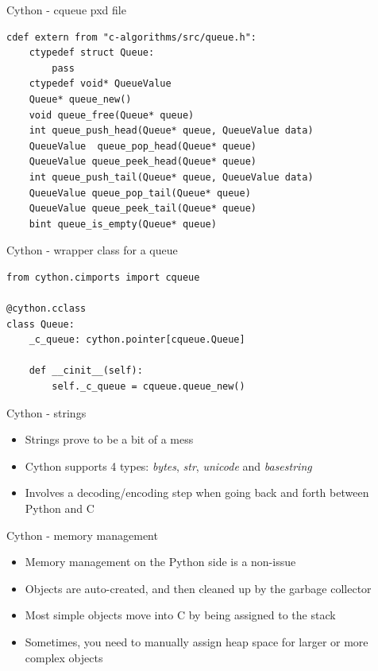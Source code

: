 \documentclass[presentation]{beamer}
\begin{document}
\begin{frame}[label=cython---cqueue-pxd-file,fragile]{Cython - cqueue pxd file}
 \begin{verbatim}
cdef extern from "c-algorithms/src/queue.h":
    ctypedef struct Queue:
        pass
    ctypedef void* QueueValue
    Queue* queue_new()
    void queue_free(Queue* queue)
    int queue_push_head(Queue* queue, QueueValue data)
    QueueValue  queue_pop_head(Queue* queue)
    QueueValue queue_peek_head(Queue* queue)
    int queue_push_tail(Queue* queue, QueueValue data)
    QueueValue queue_pop_tail(Queue* queue)
    QueueValue queue_peek_tail(Queue* queue)
    bint queue_is_empty(Queue* queue)
\end{verbatim}
\end{frame}
\begin{frame}[label=cython---wrapper-class-for-a-queue,fragile]{Cython - wrapper class for a queue}
 \begin{verbatim}
from cython.cimports import cqueue

@cython.cclass
class Queue:
    _c_queue: cython.pointer[cqueue.Queue]

    def __cinit__(self):
        self._c_queue = cqueue.queue_new()
\end{verbatim}
\end{frame}
\begin{frame}[label=cython---strings]{Cython - strings}
\begin{itemize}
\item Strings prove to be a bit of a mess
\item Cython supports 4 types: \emph{bytes}, \emph{str}, \emph{unicode} and \emph{basestring}
\item Involves a decoding/encoding step when going back and forth between
Python and C
\end{itemize}
\end{frame}
\begin{frame}[label=cython---memory-management]{Cython - memory management}
\begin{itemize}
\item Memory management on the Python side is a non-issue
\item Objects are auto-created, and then cleaned up by the garbage collector
\item Most simple objects move into C by being assigned to the stack
\item Sometimes, you need to manually assign heap space for larger or more
complex objects
\end{itemize}
\end{frame}
\end{document}
